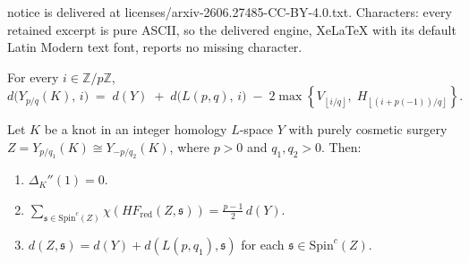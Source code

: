 \documentclass[10pt,a4paper]{amsart}
\newcommand{\HF}{HF}
\newcommand{\Spin}{\text{Spin}}
\newcommand{\Z}{{\mathbb{Z}}}
\newcommand{\din}{d}
\begin{document}
notice is delivered at licenses/arxiv-2606.27485-CC-BY-4.0.txt. Characters: every retained excerpt is pure ASCII, so the delivered engine, XeLaTeX with its default Latin Modern text font, reports no missing character.
\begin{proposition}\label{prop:UB}

For every $i \in \Z/p\Z$,
\begin{equation}\label{eq:UB}
\din\big(Y_{p/q}(K),\, i\big) \;=\;
\din(Y) \;+\; \din\big(L(p,q),\, i\big)
\;-\; 2\max\!\left\{V_{\left\lfloor i/q \right\rfloor},\;
H_{\left\lfloor (i+p(-1))/q \right\rfloor}\right\}.
\end{equation}


\end{proposition}

\begin{proposition}\label{cosmeticconstraint}
    
Let $K$ be a knot in an integer homology $L$-space $Y$ with purely
cosmetic surgery $Z = Y_{p/q_1}(K) \cong Y_{-p/q_2}(K)$,
where $p > 0$ and $q_1, q_2 > 0$.  Then:
\begin{enumerate}
\item $\Delta_K''(1) = 0$.
\item $\displaystyle\sum_{\mathfrak{s} \in \Spin^c(Z)}
\chi(\HF_{\mathrm{red}}(Z,\mathfrak{s})) = \frac{p-1}{2}\,\din(Y)$.
\item $\din(Z,\mathfrak{s}) = \din(Y) + \din(L(p,q_1),\mathfrak{s})$
for each $\mathfrak{s} \in \Spin^c(Z)$.
\end{enumerate}

\end{proposition}
\end{document}
